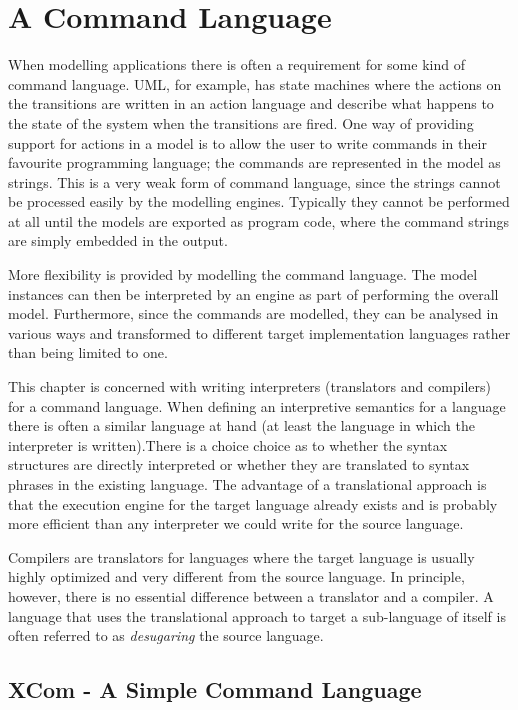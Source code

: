 
\chapter{A Command Language}

When modelling applications there is often a requirement for some
kind of command language. UML, for example, has state machines where
the actions on the transitions are written in an action language and
describe what happens to the state of the system when the transitions
are fired. One way of providing support for actions in a model is
to allow the user to write commands in their favourite programming
language; the commands are represented in the model as strings. This
is a very weak form of command language, since the strings cannot
be processed easily by the modelling engines. Typically they cannot
be performed at all until the models are exported as program code,
where the command strings are simply embedded in the output. 

More flexibility is provided by modelling the command language. The
model instances can then be interpreted by an engine as part of performing
the overall model. Furthermore, since the commands are modelled, they
can be analysed in various ways and transformed to different target
implementation languages rather than being limited to one.

This chapter is concerned with writing interpreters (translators and
compilers) for a command language. When defining an interpretive semantics
for a language there is often a similar language at hand (at least
the language in which the interpreter is written).There is a choice
choice as to whether the syntax structures are directly interpreted
or whether they are translated to syntax phrases in the existing language.
The advantage of a translational approach is that the execution engine
for the target language already exists and is probably more efficient
than any interpreter we could write for the source language.

Compilers are translators for languages where the target language
is usually highly optimized and very different from the source language.
In principle, however, there is no essential difference between a
translator and a compiler. A language that uses the translational approach
to target a sub-language of itself is often referred to as \emph{desugaring}
the source language.


\section{XCom - A Simple Command Language}

